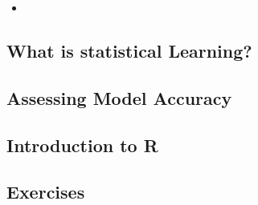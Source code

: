 \begin{itemize}
	\item
 \end{itemize}
\subsection{What is statistical Learning?}

\subsection{Assessing Model Accuracy}

\subsection{Introduction to R}

\subsection{Exercises}

